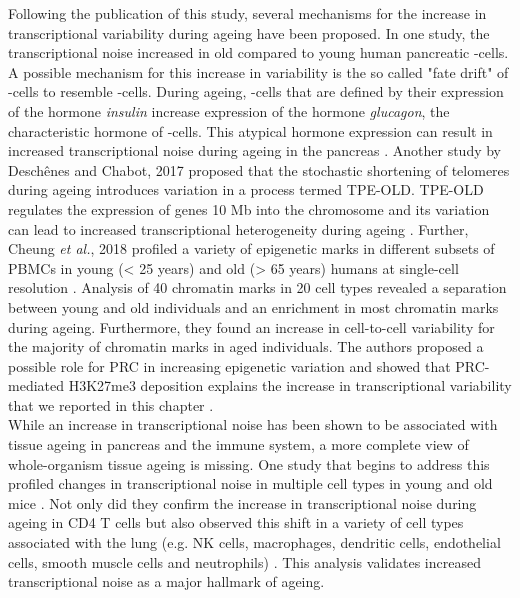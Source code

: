 Following the publication of this study, several mechanisms for the increase in transcriptional variability during ageing have been proposed. 
In one study, the transcriptional noise increased in old compared to young human pancreatic \textbeta{}-cells. 
A possible mechanism for this increase in variability is the so called "fate drift" of \textbeta{}-cells to resemble \textalpha{}-cells. 
During ageing, \textbeta{}-cells that are defined by their expression of the hormone \emph{insulin} increase expression of the hormone \emph{glucagon}, the characteristic hormone of \textalpha{}-cells. 
This atypical hormone expression can result in increased transcriptional noise during ageing in the pancreas \citep{Enge2017}. 
Another study by Desch\^{e}nes and Chabot, 2017 proposed that the stochastic shortening of telomeres during ageing introduces variation in a process termed \gls{TPE-OLD}. 
TPE-OLD regulates the expression of genes 10 Mb into the chromosome and its variation can lead to increased transcriptional heterogeneity during ageing \cite{Deschenes2017}. 
Further, Cheung \emph{et al.}, 2018 profiled a variety of epigenetic marks in different subsets of \glspl{PBMC} in young (< 25 years) and old (> 65 years) humans at single-cell resolution \citep{Cheung2018}. 
Analysis of 40 chromatin marks in 20 cell types revealed a separation between young and old individuals and an enrichment in most chromatin marks during ageing. 
Furthermore, they found an increase in cell-to-cell variability for the majority of chromatin marks in aged individuals. 
The authors proposed a possible role for \gls{PRC} in increasing epigenetic variation and showed that PRC-mediated H3K27me3 deposition explains the increase in transcriptional variability that we reported in this chapter \citep{Cheung2018}.\\

While an increase in transcriptional noise has been shown to be associated with tissue ageing in pancreas and the immune system, a more complete view of whole-organism tissue ageing is missing. 
One study that begins to address this profiled changes in transcriptional noise in multiple cell types in young and old mice \citep{Angelidis2018}. 
Not only did they confirm the increase in transcriptional noise during ageing in CD4\plus{} T cells but also observed this shift in a variety of cell types associated with the lung (e.g. NK cells, macrophages, dendritic cells, endothelial cells, smooth muscle cells and neutrophils) \citep{Angelidis2018}. 
This analysis validates increased transcriptional noise as a major hallmark of ageing. \\


